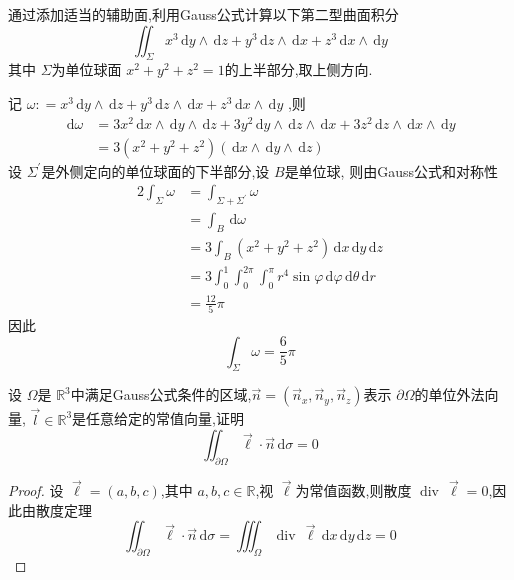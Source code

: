 \documentclass[lang=cn,12pt,color=green,fontset=none,thmcnt=section]{elegantbook}
\begin{document}
\begin{exercise}
    通过添加适当的辅助面,利用Gauss公式计算以下第二型曲面积分 $$
    \iint_{\Sigma} x^{3} \,\mathrm{d} y\wedge \,\mathrm{d} z+ y^{3} \,\mathrm{d} z\wedge \,\mathrm{d} x+ z^{3}\,\mathrm{d} x\wedge \,\mathrm{d} y
    $$其中 $ \Sigma $为单位球面 $ x^{2}+ y^{2}+ z^{2} =1 $的上半部分,取上侧方向.  
\end{exercise}
\begin{solution}
    记 $ \omega : = x^{3}\,\mathrm{d} y\wedge \,\mathrm{d} z+ y^{3}\,\mathrm{d} z\wedge \,\mathrm{d} x+ z^{3}\,\mathrm{d} x\wedge \,\mathrm{d} y $ ,则 $$
    \begin{aligned}
    \,\mathrm{d} \omega&  = 3x^{2} \,\mathrm{d} x\wedge \,\mathrm{d} y\wedge \,\mathrm{d} z+  3y^{2}\,\mathrm{d} y\wedge \,\mathrm{d} z\wedge \,\mathrm{d} x+ 3z^{2}\,\mathrm{d} z \wedge \,\mathrm{d} x\wedge \,\mathrm{d} y\\ 
     & =  3\left( x^{2}+ y^{2}+ z^{2} \right) \left( \,\mathrm{d} x\wedge \,\mathrm{d} y\wedge \,\mathrm{d} z \right)  
    \end{aligned}
    $$设 $ \Sigma^{\prime}  $是外侧定向的单位球面的下半部分,设 $ B $是单位球, 则由Gauss公式和对称性  $$
   \begin{aligned}
    2\int_{\Sigma} \omega & = \int_{\Sigma+ \Sigma^{\prime} }\omega \\ 
     & =  \int_{B}\,\mathrm{d} \omega \\ 
      & = 3 \int_{B} \left( x^{2}+ y^{2}+ z^{2} \right) \,\mathrm{d} x\,\mathrm{d} y\,\mathrm{d} z\\ 
       & = 3 \int_{0}^{1} \int_{0}^{2\pi }\int_{0}^{\pi } r^{4} \sin \varphi \,\mathrm{d} \varphi \,\mathrm{d} \theta \,\mathrm{d} r\\ 
        & = \frac{12}{5}\pi   
   \end{aligned}
    $$ 因此 $$
    \int_{\Sigma}\omega  = \frac{6}{5}\pi 
    $$
\end{solution}

\begin{exercise}
    设 $ \Omega  $是 $ \mathbb{R} ^{3} $中满足Gauss公式条件的区域,$ \vec{n} = \left( \vec{n}_{x}, \vec{n}_{y},\vec{n}_{z} \right)   $表示 $ \partial \Omega  $的单位外法向量, $ \vec{l} \in \mathbb{R} ^{3} $是任意给定的常值向量,证明 $$
    \iint_{\partial \Omega } \vec{\ell}\cdot \vec{n} \,\mathrm{d} \sigma  = 0
    $$     
\end{exercise}
\begin{proof}
    设 $\vec{\ell} = \left( a,b,c \right)  $,其中 $ a,b,c \in \mathbb{R}  $,视 $ \vec{\ell} $为常值函数,则散度 $ \operatorname{div}\, \vec{\ell} = 0 $,因此由散度定理 $$
    \iint_{\partial \Omega } \vec{\ell}\cdot  \vec{n} \,\mathrm{d} \sigma  =  \iiint_{\Omega } \operatorname{div}\,\vec{\ell} \,\mathrm{d} x\,\mathrm{d} y\,\mathrm{d} z = 0
    $$    
\end{proof}
\end{document}
